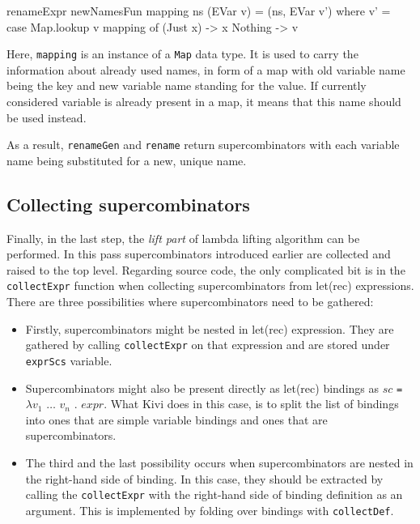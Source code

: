\documentclass[12pt,a4paper]{report}
\begin{document}
\vspace*{0.2in}
\begin{code}[style=haskell]
  renameExpr newNamesFun mapping ns (EVar v) =
      (ns, EVar v')
      where
          v' = case Map.lookup v mapping of
              (Just x) -> x
              Nothing -> v
\end{code}

Here, \texttt{mapping} is an instance of a \texttt{Map} data type. It is used
to carry the information about already used names, in form of a map with old
variable name being the key and new variable name standing for the value. If
currently considered variable is already present in a map, it means that this
name should be used instead.

As a result, \texttt{renameGen} and \texttt{rename} return supercombinators with
each variable name being substituted for a new, unique name.

\subsection{Collecting supercombinators}
Finally, in the last step, the \textit{lift part}  of lambda lifting algorithm
can be performed. In this pass supercombinators introduced earlier are
collected and raised to the top level. Regarding source code, the only
complicated bit is in the \texttt{collectExpr} function when collecting
supercombinators from let(rec) expressions. There are three possibilities
where supercombinators need to be gathered:

\begin{itemize}
  \item Firstly, supercombinators might be nested in let(rec)
    expression. They are gathered by calling \texttt{collectExpr} on that
    expression and are stored under \texttt{exprScs} variable.
  \item Supercombinators might also be present directly as let(rec)
    bindings as $sc$ \texttt{=} $\lambda v_1$ $\ldots$ $v_n$ . $expr$.
    What Kivi does in this case, is to split the list of bindings into ones that
    are simple variable bindings and ones that are supercombinators.
  \item The third and the last possibility occurs when supercombinators are
    nested in the right-hand side of binding. In this case, they should be
    extracted by calling the \texttt{collectExpr} with the right-hand side of
    binding definition as an argument. This is implemented by folding over
    bindings with \texttt{collectDef}.
\end{itemize}
\end{document}
